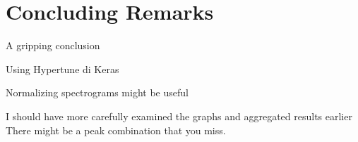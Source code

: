 
\section{Concluding Remarks}
\label{sec:conclusions}

A gripping conclusion

Using Hypertune di Keras

Normalizing spectrograms might be useful

I should have more carefully examined the graphs and aggregated results earlier
There might be a peak combination that you miss.
